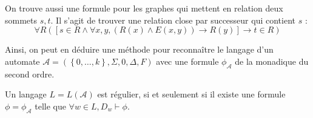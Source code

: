\documentclass{cours}
\begin{document}
\begin{example}
    On trouve aussi une formule pour les graphes qui mettent en relation deux sommets $s, t$. Il s'agit de trouver une relation close par successeur qui contient $s$ : 
    \[
        \forall R \left(\left[s \in R \land \forall x, y, \left(R(x) \land E(x, y)\right) \rightarrow R(y)\right] \rightarrow t \in R\right)    
    \]
\end{example}

Ainsi, on peut en déduire une méthode pour reconnaître le langage d'un automate $\mathcal{A} = \left(\left\{0, \ldots, k\right\}, \Sigma, 0, \Delta, F\right)$ avec une formule $\phi_{\mathcal{A}}$ de la monadique du second ordre.

\begin{theorem}
    Un langage $L = L(\mathcal{A})$ est régulier, si et seulement si il existe une formule $\phi = \phi_{\mathcal{A}}$ telle que $\forall w \in L, D_{w} \vdash \phi$.
\end{theorem}
\end{document}

